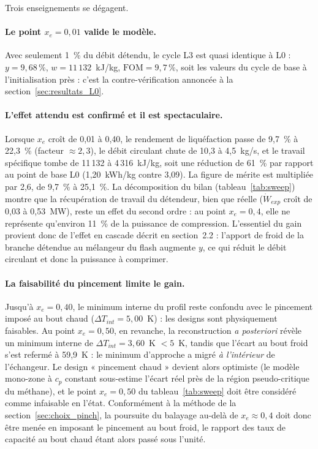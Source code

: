 
Trois enseignements se dégagent.

\paragraph{Le point $x_e = 0{,}01$ valide le modèle.}
Avec seulement 1~\% du débit détendu, le cycle L3 est quasi identique à L0 :
$y = 9{,}68\,\%$, $w = 11\,132$~kJ/kg, $\mathrm{FOM} = 9{,}7\,\%$, soit les
valeurs du cycle de base à l'initialisation près : c'est la contre-vérification
annoncée à la section~\ref{sec:resultats_L0}.

\paragraph{L'effet attendu est confirmé et il est spectaculaire.}
Lorsque $x_e$ croît de 0{,}01 à 0{,}40, le rendement de liquéfaction passe de
9{,}7~\% à 22{,}3~\% (facteur $\approx 2{,}3$), le débit circulant chute de
10{,}3 à 4{,}5~kg/s, et le travail spécifique tombe de 11\,132 à
4\,316~kJ/kg, soit une réduction de 61~\% par rapport au point de base L0
(1,20~kWh/kg contre 3,09). La figure de mérite est multipliée par 2{,}6,
de 9{,}7~\% à 25{,}1~\%. La décomposition du bilan
(tableau~\ref{tab:sweep}) montre que la récupération de travail du
détendeur, bien que réelle ($\dot W_{exp}$ croît de 0{,}03 à 0{,}53~MW),
reste un effet du second ordre : au point $x_e = 0{,}4$, elle ne représente
qu'environ 11~\% de la puissance de compression. L'essentiel du gain provient
donc de l'effet en cascade décrit en section~2.2 : l'apport de froid de la
branche détendue au mélangeur du flash augmente $y$, ce qui réduit le débit
circulant et donc la puissance à comprimer.

\paragraph{La faisabilité du pincement limite le gain.}
Jusqu'à $x_e = 0{,}40$, le minimum interne du profil reste confondu avec le
pincement imposé au bout chaud ($\Delta T_{int} = 5{,}00$~K) : les designs
sont physiquement faisables. Au point $x_e = 0{,}50$, en revanche, la
reconstruction \emph{a posteriori} révèle un minimum interne de
$\Delta T_{int} = 3{,}60$~K $< 5$~K, tandis que l'écart au bout froid s'est
refermé à 59{,}9~K : le minimum d'approche a migré \emph{à l'intérieur} de
l'échangeur. Le design « pincement chaud » devient alors optimiste (le
modèle mono-zone à $c_p$ constant sous-estime l'écart réel près de la
région pseudo-critique du méthane), et le point $x_e = 0{,}50$ du
tableau~\ref{tab:sweep} doit être considéré comme infaisable en l'état.
Conformément à la méthode de la section~\ref{sec:choix_pinch}, la poursuite
du balayage au-delà de $x_e \approx 0{,}4$ doit donc être menée en imposant
le pincement au bout froid, le rapport des taux de capacité au bout chaud
étant alors passé sous l'unité.

